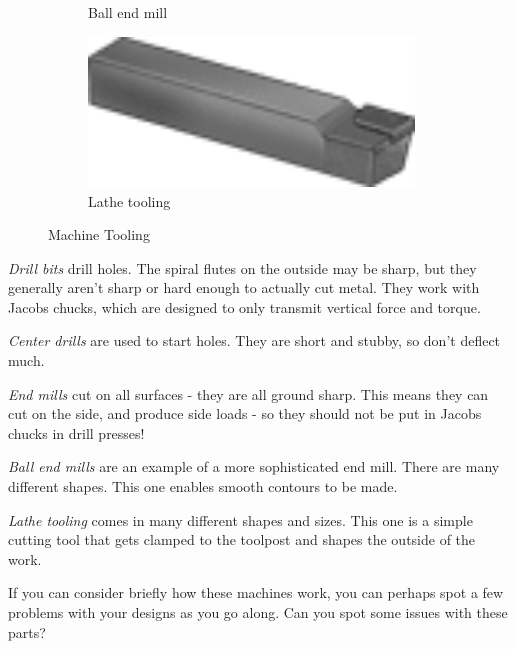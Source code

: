 \documentclass[10pt,letterpaper]{book}
\begin{document}
\begin{figure}[H]
\begin{subfigure}[b]{.19\linewidth}
		\caption{Ball end mill}
	\end{subfigure}\begin{subfigure}[b]{.19\linewidth}
		\includegraphics[width=0.95\textwidth]{imgs/lathetool.png}
		\caption{Lathe tooling}
	\end{subfigure}	
	
	\caption{Machine Tooling}
\end{figure}

 \begin{asparaenum}[a)]
 	\item \textit{Drill bits} drill holes. The spiral flutes on the outside may be sharp, but they generally aren't sharp or hard enough to actually cut metal. They work with Jacobs chucks, which are designed to only transmit vertical force and torque.
 	\item \textit{Center drills} are used to start holes. They are short and stubby, so don't deflect much.
 	\item \textit{End mills} cut on all surfaces - they are all ground sharp. This means they can cut on the side, and produce side loads - so they should not be put in Jacobs chucks in drill presses!
 	\item \textit{Ball end mills} are an example of a more sophisticated end mill. There are many different shapes. This one enables smooth contours to be made.
 	\item \textit{Lathe tooling} comes in many different shapes and sizes. This one is a simple cutting tool that gets clamped to the toolpost and shapes the outside of the work.
 \end{asparaenum}
 
If you can consider briefly how these machines work, you can perhaps spot a few problems with your designs as you go along. Can you spot some issues with these parts?
 
\end{document}

